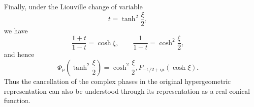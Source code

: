 \IfFileExists{iopjournal.cls}{\documentclass{iopjournal}}{\documentclass{iopjournal-draft}}
\theoremstyle{definition}
\theoremstyle{remark}
\numberwithin{equation}{section}
\begin{document}
Finally, under the Liouville change of variable
\[
t=\tanh^2\frac{\xi}{2},
\]
we have
\[
\frac{1+t}{1-t}=\cosh\xi,
\qquad
\frac{1}{1-t}=\cosh^2\frac{\xi}{2},
\]
and hence
\[
\Phi_\mu\left(\tanh^2\frac{\xi}{2}\right)
=	
\cosh^2\frac{\xi}{2},
P_{-1/2+i\mu}(\cosh\xi).
\]
Thus the cancellation of the complex phases in the original hypergeometric representation can also be understood through its representation as a real conical function.


%
\end{document}
